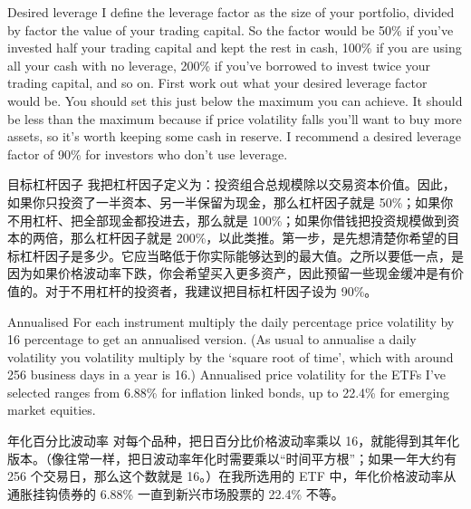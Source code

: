 \begin{englishblock} Desired leverage I define the leverage factor as the size of your portfolio, divided by factor the value of your trading capital. So the factor would be 50\% if you've invested half your trading capital and kept the rest in cash, 100\% if you are using all your cash with no leverage, 200\% if you've borrowed to invest twice your trading capital, and so on. First work out what your desired leverage factor would be. You should set this just below the maximum you can achieve. It should be less than the maximum because if price volatility falls you'll want to buy more assets, so it's worth keeping some cash in reserve. I recommend a desired leverage factor of 90\% for investors who don't use leverage. \end{englishblock}

\begin{chineseblock}目标杠杆因子 我把杠杆因子定义为：投资组合总规模除以交易资本价值。因此，如果你只投资了一半资本、另一半保留为现金，那么杠杆因子就是 50\%；如果你不用杠杆、把全部现金都投进去，那么就是 100\%；如果你借钱把投资规模做到资本的两倍，那么杠杆因子就是 200\%，以此类推。第一步，是先想清楚你希望的目标杠杆因子是多少。它应当略低于你实际能够达到的最大值。之所以要低一点，是因为如果价格波动率下跌，你会希望买入更多资产，因此预留一些现金缓冲是有价值的。对于不用杠杆的投资者，我建议把目标杠杆因子设为 90\%。 \end{chineseblock}

\bipairgap

\begin{englishblock} Annualised For each instrument multiply the daily percentage price volatility by 16 percentage to get an annualised version. (As usual to annualise a daily volatility you volatility multiply by the ‘square root of time', which with around 256 business days in a year is 16.) Annualised price volatility for the ETFs I've selected ranges from 6.88\% for inflation linked bonds, up to 22.4\% for emerging market equities. \end{englishblock}

\begin{chineseblock}年化百分比波动率 对每个品种，把日百分比价格波动率乘以 16，就能得到其年化版本。（像往常一样，把日波动率年化时需要乘以“时间平方根”；如果一年大约有 256 个交易日，那么这个数就是 16。）在我所选用的 ETF 中，年化价格波动率从通胀挂钩债券的 6.88\% 一直到新兴市场股票的 22.4\% 不等。\end{chineseblock}

\bipairgap

